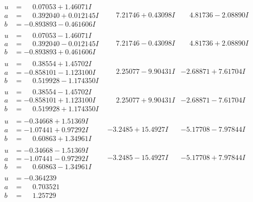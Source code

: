 \documentclass[1p]{elsarticle_modified}
\theoremstyle{definition}
\begin{document}
$$\begin{array}{c|c|c}
\begin{aligned}
u &= \phantom{-}0.07053 + 1.46071 I \\
a &= \phantom{-}0.392040 + 0.012145 I \\
b &= -0.893893 - 0.461606 I\end{aligned}
 & \phantom{-}7.21746 + 0.43098 I & \phantom{-}4.81736 - 2.08890 I \\ \hline\begin{aligned}
u &= \phantom{-}0.07053 - 1.46071 I \\
a &= \phantom{-}0.392040 - 0.012145 I \\
b &= -0.893893 + 0.461606 I\end{aligned}
 & \phantom{-}7.21746 - 0.43098 I & \phantom{-}4.81736 + 2.08890 I \\ \hline\begin{aligned}
u &= \phantom{-}0.38554 + 1.45702 I \\
a &= -0.858101 - 1.123100 I \\
b &= \phantom{-}0.519928 - 1.174350 I\end{aligned}
 & \phantom{-}2.25077 - 9.90431 I & -2.68871 + 7.61704 I \\ \hline\begin{aligned}
u &= \phantom{-}0.38554 - 1.45702 I \\
a &= -0.858101 + 1.123100 I \\
b &= \phantom{-}0.519928 + 1.174350 I\end{aligned}
 & \phantom{-}2.25077 + 9.90431 I & -2.68871 - 7.61704 I \\ \hline\begin{aligned}
u &= -0.34668 + 1.51369 I \\
a &= -1.07441 + 0.97292 I \\
b &= \phantom{-}0.60863 + 1.34961 I\end{aligned}
 & -3.2485 + 15.4927 I & -5.17708 - 7.97844 I \\ \hline\begin{aligned}
u &= -0.34668 - 1.51369 I \\
a &= -1.07441 - 0.97292 I \\
b &= \phantom{-}0.60863 - 1.34961 I\end{aligned}
 & -3.2485 - 15.4927 I & -5.17708 + 7.97844 I \\ \hline\begin{aligned}
u &= -0.364239\phantom{ +0.000000I} \\
a &= \phantom{-}0.703521\phantom{ +0.000000I} \\
b &= \phantom{-}1.25729\phantom{ +0.000000I}\end{aligned}

\end{array}$$
\end{document}
